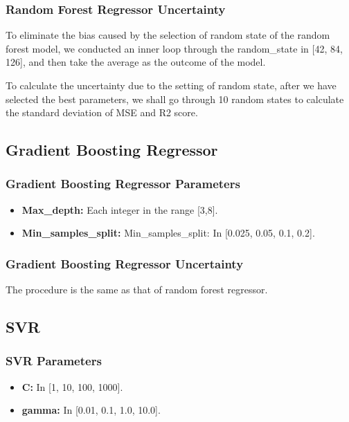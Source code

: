 \documentclass{article}
\begin{document}
\subsubsection{Random Forest Regressor Uncertainty}
To eliminate the bias caused by the selection of random state of the random forest model, we conducted an inner loop through the random\_state in [42, 84, 126], and then take the average as the outcome of the model. \par
To calculate the uncertainty due to the setting of random state, after we have selected the best parameters, we shall go through 10 random states to calculate the standard deviation of MSE and R2 score.


\subsection{Gradient Boosting Regressor}

\subsubsection{Gradient Boosting Regressor Parameters}
\begin{itemize}
\item \textbf{Max\_depth:}
Each integer in the range [3,8].
\item \textbf{Min\_samples\_split:}
Min\_samples\_split: In [0.025, 0.05, 0.1, 0.2].
\end{itemize}

\subsubsection{Gradient Boosting Regressor Uncertainty}
The procedure is the same as that of random forest regressor.

\subsection{SVR}

\subsubsection{SVR Parameters}
\begin{itemize}
\item \textbf{C:}
In [1, 10, 100, 1000].
\item \textbf{gamma:}
In [0.01, 0.1, 1.0, 10.0].
\end{itemize}
\end{document}
